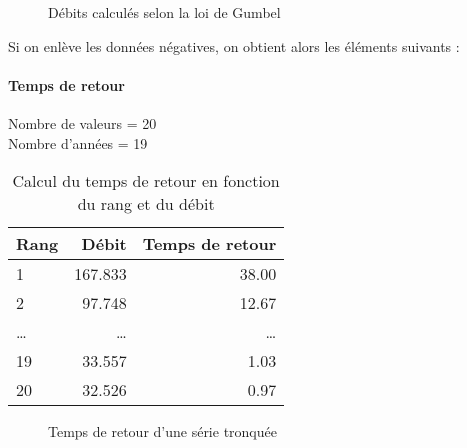 \begin{figure}[H]
    \centering
    \caption{Débits calculés selon la loi de Gumbel}
    \label{graph:debits_gumbel_tronquee}
\end{figure}

Si on enlève les données négatives, on obtient alors les éléments suivants :
\paragraph{Temps de retour}
Nombre de valeurs = 20 \\
Nombre d'années = 19
\begin{multicols}{2}
    \begin{table}[H]
        \centering
        \begin{tabular}{l|r|r}
            \toprule
            \textbf{Rang} & \textbf{Débit} & \textbf{Temps de retour} \\
            \midrule
            1             & 167.833        & 38.00                    \\
            2             & 97.748         & 12.67                    \\
            \dots         & \dots          & \dots                    \\
            19            & 33.557         & 1.03                    \\
            20            & 32.526         & 0.97                     \\
            \bottomrule
        \end{tabular}
        \caption{Calcul du temps de retour en fonction du rang et du débit}
        \label{tab:serieTronquee2_tempsRetour}
    \end{table}

    \columnbreak

    \begin{figure}[H]
        \centering
        \resizebox*{0.45\textwidth}{!}{
            
        }
        \caption{Temps de retour d'une série tronquée}
        \label{graph:tempsRetour2_serieTronquee}
    \end{figure}
\end{multicols}

